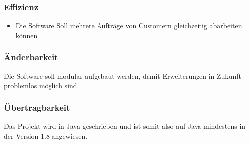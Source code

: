 \subsubsection{Effizienz}
\begin{itemize}
  \item Die Software Soll mehrere Aufträge von Customern gleichzeitig abarbeiten können
\end{itemize}
\subsubsection{Änderbarkeit}
Die Software soll modular aufgebaut werden, damit Erweiterungen in Zukunft 
problemlos möglich sind.
\subsubsection{Übertragbarkeit}
Das Projekt wird in Java geschrieben und ist somit also auf Java mindestens in der Version 
1.8 angewiesen.
